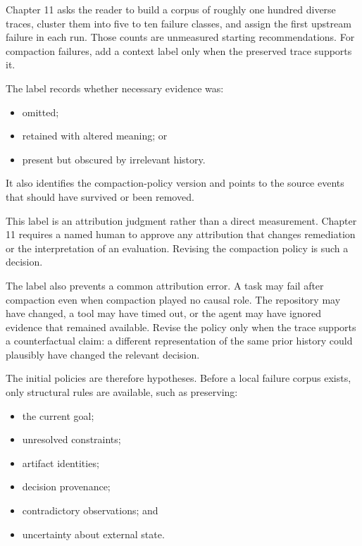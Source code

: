 Chapter 11 asks the reader to build a corpus of roughly one hundred diverse traces, cluster them into five to ten failure classes, and assign the first upstream failure in each run. Those counts are unmeasured starting recommendations. For compaction failures, add a context label only when the preserved trace supports it.


The label records whether necessary evidence was:

\begin{itemize}
\tightlist
\item
  omitted;
\item
  retained with altered meaning; or
\item
  present but obscured by irrelevant history.
\end{itemize}

It also identifies the compaction-policy version and points to the source events that should have survived or been removed.

This label is an attribution judgment rather than a direct measurement. Chapter 11 requires a named human to approve any attribution that changes remediation or the interpretation of an evaluation. Revising the compaction policy is such a decision.

The label also prevents a common attribution error. A task may fail after compaction even when compaction played no causal role. The repository may have changed, a tool may have timed out, or the agent may have ignored evidence that remained available. Revise the policy only when the trace supports a counterfactual claim: a different representation of the same prior history could plausibly have changed the relevant decision.


The initial policies are therefore hypotheses. Before a local failure corpus exists, only structural rules are available, such as preserving:

\begin{itemize}
\tightlist
\item
  the current goal;
\item
  unresolved constraints;
\item
  artifact identities;
\item
  decision provenance;
\item
  contradictory observations; and
\item
  uncertainty about external state.
\end{itemize}


